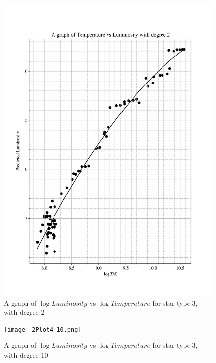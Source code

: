 \documentclass[12pt, a4paper]{article}
\begin{document}
\begin{figure}[H]
    \centering
    \includegraphics[width = \textwidth]{2Plot4_2.png}
    \caption{A graph of \(\log{Luminosity}\) vs \(\log{Temperature}\) for star type 3, with degree 2}
    \label{fig:Fig 2.4}
\end{figure}

\begin{figure}[H]
    \centering
    \texttt{[image: 2Plot4\_10.png]}
    \caption{A graph of \(\log{Luminosity}\) vs \(\log{Temperature}\) for star type 3, with degree 10}
    \label{fig:Fig 2.5}
\end{figure}
\end{document}
